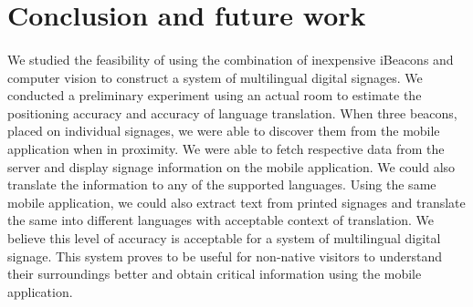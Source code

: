 \documentclass[12pt]{article}
\begin{document}
%
%
%
%
%




\section{ Conclusion and future work}
\label{sect-conclusion}
\paragraph{}We studied the feasibility of using the combination of inexpensive iBeacons and computer vision to construct a system of multilingual digital signages. We conducted a preliminary experiment using an actual room to estimate the positioning accuracy and accuracy of language translation. When three beacons, placed on individual signages, we were able to discover them from the mobile application when in proximity. We were able to fetch respective data from the server and display signage information on the mobile application. We could also translate the information to any of the supported languages. Using the same mobile application, we could also extract text from printed signages and translate the same into different languages with acceptable context of translation. We believe this level of accuracy is acceptable for a system of multilingual digital signage. This system proves to be useful for non-native visitors to understand their surroundings better and obtain critical information using the mobile application. 

%
\end{document}
